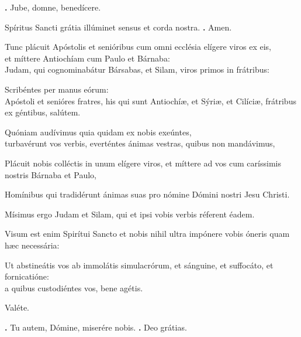 \begin{small}
\textbf{\Vbar.} Jube, domne, benedícere.

Spíritus Sancti grátia illúminet sensus et corda nostra.
\textbf{\Rbar.} Amen.
\end{small}


Tunc plácuit Apóstolis et senióribus cum omni ecclésia elígere viros ex eis, \\
et míttere Antiochíam cum Paulo et Bárnaba: \\
Judam, qui cognominabátur Bársabas, et Silam, viros primos in frátribus:

Scribéntes per manus eórum: \\
Apóstoli et senióres fratres, his qui sunt Antiochíæ, et Sýriæ, et Cilíciæ, frátribus ex géntibus, salútem.

Quóniam audívimus quia quidam ex nobis exeúntes, \\
turbavérunt vos verbis, everténtes ánimas vestras, quibus non mandávimus,

Plácuit nobis colléctis in unum elígere viros, et míttere ad vos cum caríssimis nostris Bárnaba et Paulo,

Homínibus qui tradidérunt ánimas suas pro nómine Dómini nostri Jesu Christi.

Mísimus ergo Judam et Silam, qui et ipsi vobis verbis réferent éadem.

Visum est enim Spirítui Sancto et nobis nihil ultra impónere vobis óneris quam hæc necessária:

Ut abstineátis vos ab immolátis simulacrórum, et sánguine, et suffocáto, et fornicatióne: \\
a quibus custodiéntes vos, bene agétis. 

Valéte.

\textbf{\Vbar.} Tu autem, Dómine, miserére nobis.
\textbf{\Rbar.} Deo grátias.

